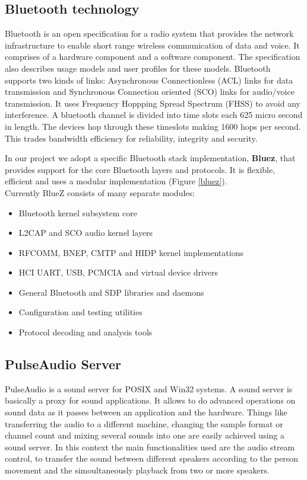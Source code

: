 \documentclass[conference]{./IEEEtran}
\begin{document}
\subsection{Bluetooth technology}
Bluetooth is an open specification for a radio system that provides the network infrastructure to enable short range wireless communication of data and voice. It comprises of a hardware component and a software component. The specification also describes usage models and user profiles for these models. 
Bluetooth supports two kinds of links: Asynchronous Connectionless (ACL) links for data transmission and Synchronous Connection oriented (SCO) links for audio/voice transmission. It uses Frequency Hoppping Spread Spectrum (FHSS) to avoid any interference. A bluetooth channel is divided into time slots each 625 micro second in length. The devices hop through these timeslots making 1600 hops per second. This trades bandwidth efficiency for reliability, integrity and security.

In our project we adopt a specific Bluetooth stack implementation, \textbf{Bluez}, that provides support for the core Bluetooth layers and protocols. It is flexible, efficient and uses a modular implementation (Figure \ref{bluez}). \\
Currently BlueZ consists of many separate modules:
\begin{itemize}
\item Bluetooth kernel subsystem core
\item L2CAP and SCO audio kernel layers
\item RFCOMM, BNEP, CMTP and HIDP kernel implementations
\item HCI UART, USB, PCMCIA and virtual device drivers
\item General Bluetooth and SDP libraries and daemons
\item Configuration and testing utilities
\item Protocol decoding and analysis tools
\end{itemize}


\subsection{PulseAudio Server}
PulseAudio is a sound server for POSIX and Win32 systems. A sound server is basically a proxy for sound applications. It allows to do advanced operations on sound data as it passes between an application and the hardware. Things like transferring the audio to a different machine, changing the sample format or channel count and mixing several sounds into one are easily achieved using a sound server. In this context the main functionalities used are the audio stream control, to transfer the sound between different speakers according to the person movement and the simoultaneously playback from two or more speakers.  
\end{document}
